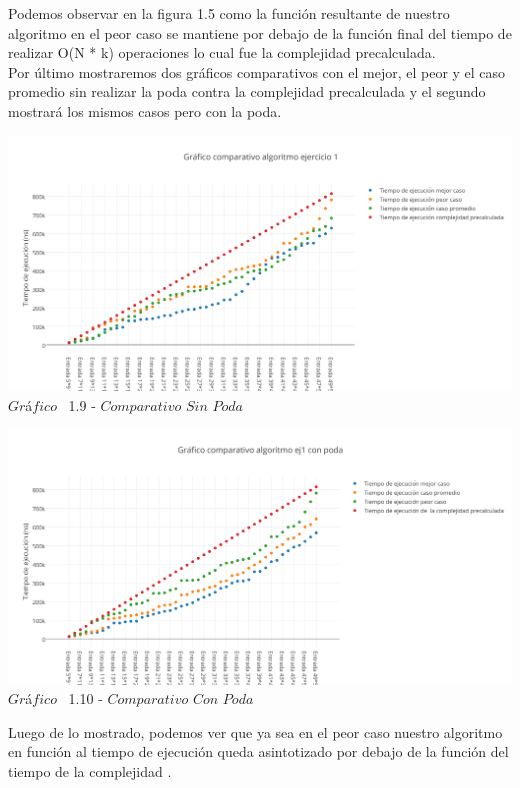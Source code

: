 Podemos observar en la figura 1.5 como la funci\'on resultante de nuestro algoritmo en el peor caso se mantiene por debajo de la funci\'on final del tiempo de realizar O(N * k) operaciones lo cual fue la complejidad precalculada.\\

Por \'ultimo mostraremos dos gr\'aficos comparativos con el mejor, el peor y el caso promedio sin realizar la poda contra la complejidad precalculada y el segundo mostrar\'a los mismos casos pero con la poda.\\

\vspace*{0.3cm} \vspace*{0.3cm}
  \begin{center}
\includegraphics[scale=0.65]{./EJ1/comparativo.png}
{$Gr$\'a$fico$ \ 1.9 - $Comparativo$ $Sin$ $Poda$}
  \end{center}
  \vspace*{0.3cm}
  
  \vspace*{0.3cm} \vspace*{0.3cm}
  \begin{center}
\includegraphics[scale=0.65]{./EJ1/comparativo1.png}
{$Gr$\'a$fico$ \ 1.10 - $Comparativo$ $Con$ $Poda$}
  \end{center}
  \vspace*{0.3cm}


Luego de lo mostrado, podemos ver que ya sea en el peor caso nuestro algoritmo en funci\'on al tiempo de ejecuci\'on queda asintotizado por debajo de la funci\'on del tiempo de la complejidad .
